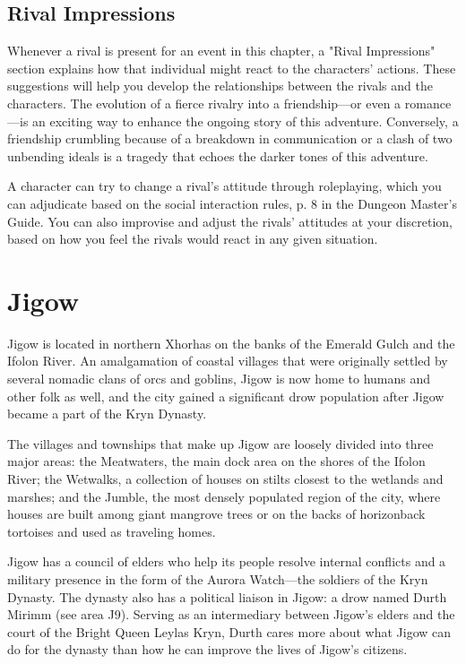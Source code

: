 \documentclass[a4paper, 11pt, bg=full, twocolumn, nooutline]{dndbook}
\begin{document}
\subsection{Rival Impressions}

Whenever a rival is present for an event in this chapter, a "Rival Impressions" section explains how that individual might react to the characters' actions. These suggestions will help you develop the relationships between the rivals and the characters. The evolution of a fierce rivalry into a friendship---or even a romance---is an exciting way to enhance the ongoing story of this adventure. Conversely, a friendship crumbling because of a breakdown in communication or a clash of two unbending ideals is a tragedy that echoes the darker tones of this adventure.

A character can try to change a rival's attitude through roleplaying, which you can adjudicate based on the social interaction rules, p. 8 in the Dungeon Master's Guide. You can also improvise and adjust the rivals' attitudes at your discretion, based on how you feel the rivals would react in any given situation.
\section{Jigow}

Jigow is located in northern Xhorhas on the banks of the Emerald Gulch and the Ifolon River. An amalgamation of coastal villages that were originally settled by several nomadic clans of orcs and goblins, Jigow is now home to humans and other folk as well, and the city gained a significant drow population after Jigow became a part of the Kryn Dynasty.

The villages and townships that make up Jigow are loosely divided into three major areas: the Meatwaters, the main dock area on the shores of the Ifolon River; the Wetwalks, a collection of houses on stilts closest to the wetlands and marshes; and the Jumble, the most densely populated region of the city, where houses are built among giant mangrove trees or on the backs of horizonback tortoises and used as traveling homes.

Jigow has a council of elders who help its people resolve internal conflicts and a military presence in the form of the Aurora Watch---the soldiers of the Kryn Dynasty. The dynasty also has a political liaison in Jigow: a drow named Durth Mirimm (see area J9). Serving as an intermediary between Jigow's elders and the court of the Bright Queen Leylas Kryn, Durth cares more about what Jigow can do for the dynasty than how he can improve the lives of Jigow's citizens.
\end{document}
